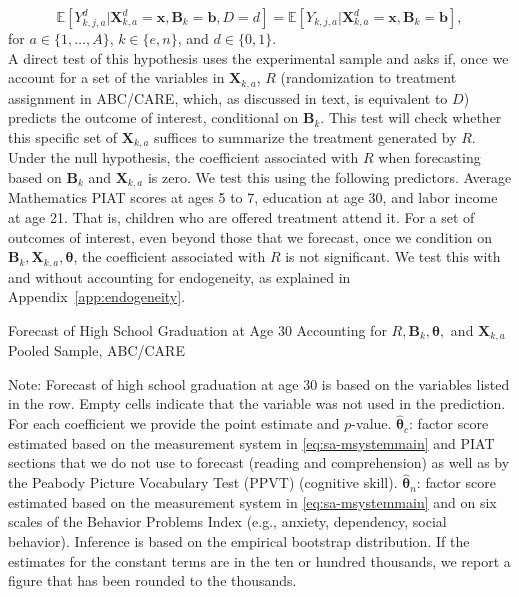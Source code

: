 \begin{equation}\label{eq:invariancetestapp}
\mathbb{E} \left[ Y_{k,j,a}^d | \bm{X}_{k,a}^d  = \bm{x}, \bm{B}_k = \bm{b}, D = d \right] = \mathbb{E} \left[ Y_{k,j,a} | \bm{X}^d_{k,a}  = \bm{x}, \bm{B}_k = \bm{b} \right],
\end{equation}
for $a \in \{1,\dots,A\}$, $k \in \{e,n\}$, and $d \in \{0,1\}$.\\

\noindent A direct test of this hypothesis uses the experimental sample and asks if, once we account for a set of the variables in $\bm{X}_{k,a}$, $R$ (randomization to treatment assignment in ABC/CARE, which, as discussed in text, is equivalent to $D$)  predicts the outcome of interest, conditional on $\bm{B}_k$. This test will check whether this specific set of $\bm{X}_{k,a}$ suffices to summarize the treatment generated by $R$. Under the null hypothesis, the coefficient associated with $R$ when forecasting based on $\bm{B}_k$ and $\bm{X}_{k,a}$ is zero. We test this using the following predictors. Average Mathematics PIAT scores at ages 5 to 7, education at age 30, and labor income at age 21. That is, children who are offered treatment attend it. For a set of outcomes of interest, even beyond those that we forecast, once we condition on $\bm{B}_k, \bm{X}_{k,a}, \bm{\theta}$, the coefficient associated with $R$ is not significant. We test this with and without accounting for endogeneity, as explained in Appendix~\ref{app:endogeneity}.\\

\begin{table}
\begin{threeparttable}
\caption{Forecast of High School Graduation at Age 30 Accounting for $R, \bm{B}_k, \bm{\theta},$ and $\bm{X}_{k,a}$ Pooled Sample, ABC/CARE}
\label{table:end2}
\centering
\scriptsize

\begin{tablenotes}
\footnotesize
\item Note: Forecast of high school graduation at age 30 is based on the variables listed in the row. Empty cells indicate that the variable was not used in the prediction. For each coefficient we provide the point estimate and $p$-value. $\hat{\bm{\theta}}_{c}$: factor score estimated based on the measurement system in \eqref{eq:sa-msystemmain} and PIAT sections that we do not use to forecast (reading and comprehension) as well as by the Peabody Picture Vocabulary Test (PPVT) (cognitive skill). $\hat{\bm{\theta}}_{n}$: factor score estimated based on the measurement system in \eqref{eq:sa-msystemmain} and on six scales of the Behavior Problems Index (e.g., anxiety, dependency, social behavior). Inference is based on the empirical bootstrap distribution. If the estimates for the constant terms are in the ten or hundred thousands, we report a figure that has been rounded to the thousands.
\end{tablenotes}
\end{threeparttable}
\end{table}

